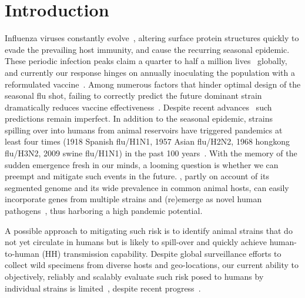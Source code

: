 \documentclass[onecolumn, compsoc,10pt]{IEEEtran}
\begin{document}
\section*{Introduction}
Influenza viruses constantly evolve~\cite{dos2016influenza}, altering surface protein structures quickly   to evade the prevailing host immunity, and cause the recurring seasonal  epidemic. These periodic  infection peaks claim a quarter to half a million lives~\cite{huddleston2020integrating} globally,  and currently our response hinges on annually  inoculating  the  population with a  reformulated  vaccine~\cite{boni2008vaccination,dos2016influenza}.  Among numerous factors that hinder optimal design of the seasonal flu shot, failing to correctly predict the future dominant strain  dramatically reduces vaccine effectiveness~\cite{tricco2013comparing}. Despite  recent advances~\cite{neher2014predicting,huddleston2020integrating} such predictions remain imperfect. In addition to  the seasonal  epidemic,  \infl strains spilling over into humans from animal reservoirs have triggered  pandemics  at least four times (1918 Spanish flu/H1N1, 1957 Asian flu/H2N2, 1968 hongkong flu/H3N2, 2009 swine flu/H1N1) in the past 100 years~\cite{shao2017evolution}. With the memory of the  sudden \hcov emergence
fresh in our minds, a looming question  is whether we can  preempt and mitigate such events in the future. \infl, partly on account of its segmented genome and its wide prevalence in common animal hosts, can easily incorporate genes from multiple strains and (re)emerge as novel human pathogens~\cite{reid2003origin,vergara2014ns}, thus harboring  a high pandemic potential.



A possible approach to mitigating such risk is to identify  animal strains  that do not yet circulate in humans but is likely to spill-over and quickly achieve human-to-human (HH) transmission capability. Despite global surveillance efforts to  collect wild specimens from diverse hosts and geo-locations, our  current ability to objectively, reliably and scalably  evaluate such risk posed to  humans by  individual   strains  is  limited~\cite{wille2021accurately}, despite recent progress~\cite{pulliam2009ability,grewelle2020larger,grange2021ranking}. %
\end{document}
